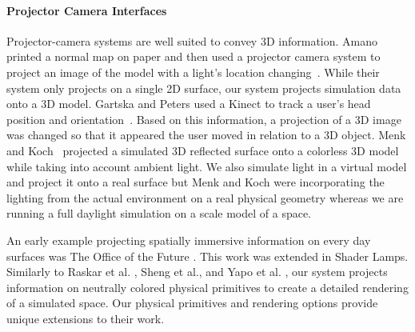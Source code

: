 \documentclass[10pt,twocolumn,letterpaper]{article}
\begin{document}
\paragraph{Projector Camera Interfaces}
%
%
%
%
Projector-camera systems are well suited to convey 3D information.
Amano printed a normal map on paper and then used a
projector camera system to project an image of the model with a
light's location changing~\cite{DBLP:conf/cvpr/Amano12}.  While their
system only projects on a single 2D surface, our system projects simulation
data onto a 3D model. Gartska and
Peters used a Kinect to track a user's head position and
orientation~\cite{Garstka_Peters_2004}.  Based on this information, a
projection of a 3D image was changed so that it appeared the user
moved in relation to a 3D object.  Menk and Koch~\cite{menkandkoch}
projected a simulated 3D reflected surface onto a colorless 3D model while taking into
account ambient light.  We also simulate light in a virtual model and
project it onto a real surface but Menk and Koch were incorporating
the lighting from the actual environment on a real physical geometry whereas we are
running a full daylight simulation on a scale model of a space.



An early example projecting 
spatially immersive information on every day surfaces was The Office of the Future
\cite{Raskar:1998:OFU:280814.280861}.  This work was extended in
Shader Lamps\cite{Raskar:2001:SLA}.  Similarly to Raskar et al.
\cite{Raskar:2001:SLA}, Sheng et al.\cite{ShengYYC09, sheng_TVCG}, and Yapo et al.
\cite{5543463}, our system projects information on neutrally colored
physical primitives to create a detailed rendering of a simulated
space.  Our physical primitives and rendering options provide unique
extensions to their work.
\end{document}
